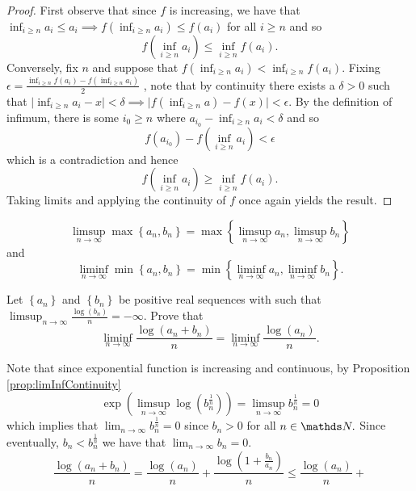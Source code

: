 \begin{proof}
First observe that since $f$ is increasing, we have that $\inf_{i\geq n}a_{i}\leq a_{i}\implies f\left(\inf_{i\geq n}a_{i}\right)\leq f\left(a_{i}\right)$
for all $i\geq n$ and so
\[
f\left(\inf_{i\geq n}a_{i}\right)\leq\inf_{i\geq n}f\left(a_{i}\right).
\]
Conversely, fix $n$ and suppose that $f\left(\inf_{i\geq n}a_{i}\right)<\inf_{i\geq n}f\left(a_{i}\right)$.
Fixing $\epsilon=\frac{\inf_{i\geq n}f\left(a_{i}\right)-f\left(\inf_{i\geq n}a_{i}\right)}{2}$
, note that by continuity there exists a $\delta>0$ such that $\lvert\inf_{i\geq n}a_{i}-x\rvert<\delta\implies\lvert f\left(\inf_{i\geq n}a\right)-f\left(x\right)\rvert<\epsilon$.
By the definition of infimum, there is some $i_{0}\geq n$ where $a_{i_{0}}-\inf_{i\geq n}a_{i}<\delta$
and so 
\[
f\left(a_{i_{0}}\right)-f\left(\inf_{i\geq n}a_{i}\right)<\epsilon
\]
which is a contradiction and hence 
\[
f\left(\inf_{i\geq n}a_{i}\right)\geq\inf_{i\geq n}f\left(a_{i}\right).
\]
Taking limits and applying the continuity of $f$ once again yields
the result.
\end{proof}
\begin{prop}
\[
\limsup_{n\to\infty}\max\left\{ a_{n},b_{n}\right\} =\max\left\{ \limsup_{n\to\infty}a_{n},\limsup_{n\to\infty}b_{n}\right\} 
\]
 and 
\[
\liminf_{n\to\infty}\min\left\{ a_{n},b_{n}\right\} =\min\left\{ \liminf_{n\to\infty}a_{n},\liminf_{n\to\infty}b_{n}\right\} .
\]
\end{prop}

\begin{xca}
Let $\left\{ a_{n}\right\} $ and $\left\{ b_{n}\right\} $ be positive
real sequences with such that $\limsup_{n\to\infty}\frac{\log\left(b_{n}\right)}{n}=-\infty$.
Prove that 
\[
\liminf_{n\to\infty}\frac{\log\left(a_{n}+b_{n}\right)}{n}=\liminf_{n\to\infty}\frac{\log\left(a_{n}\right)}{n}.
\]
\end{xca}

\begin{sol*}
Note that since exponential function is increasing and continuous,
by Proposition \ref{prop:limInfContinuity}
\[
\exp\left(\limsup_{n\to\infty}\log\left(b_{n}^{\frac{1}{n}}\right)\right)=\limsup_{n\to\infty}b_{n}^{\frac{1}{n}}=0
\]
which implies that $\lim_{n\to\infty}b_{n}^{\frac{1}{n}}=0$ since
$b_{n}>0$ for all $n\in\N.$ Since eventually, $b_{n}<b_{n}^{\frac{1}{n}}$
we have that $\lim_{n\to\infty}b_{n}=0.$ 
\[
\frac{\log\left(a_{n}+b_{n}\right)}{n}=\frac{\log\left(a_{n}\right)}{n}+\frac{\log\left(1+\frac{b_{n}}{a_{n}}\right)}{n}\leq\frac{\log\left(a_{n}\right)}{n}+
\]
\end{sol*}

